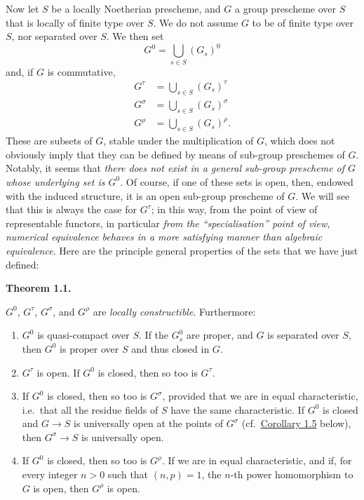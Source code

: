 \documentclass{article}
\providecommand{\tightlist}{%
  \setlength{\itemsep}{0pt}\setlength{\parskip}{0pt}}
\newenvironment{itenv}[1]
  {\phantomsection\par\smallskip\noindent\textbf{#1.}\itshape}
  {\par\smallskip}
\newcommand{\oldpage}[1]{\marginpar{\footnotesize$\Big\vert$ \textit{p.~#1}}}
\theoremstyle{definition}
\theoremstyle{definition}
\theoremstyle{definition}
\theoremstyle{definition}
\theoremstyle{remark}
\begin{document}
Now let \(S\) be a locally Noetherian prescheme, and \(G\) a group prescheme over \(S\) that is locally of finite type over \(S\).
We do not assume \(G\) to be of finite type over \(S\), nor separated over \(S\).
We then set
\[
  G^0
  = \bigcup_{s\in S} (G_s)^0
\]
and, if \(G\) is commutative,
\[
  \begin{aligned}
    G^\tau
    &= \bigcup_{s\in S} (G_s)^\tau
  \\G^\sigma
    &= \bigcup_{s\in S} (G_s)^\sigma
  \\G^\rho
    &= \bigcup_{s\in S} (G_s)^\rho.
  \end{aligned}
\]
\oldpage{236-04}These are subsets of \(G\), stable under the multiplication of \(G\), which does not obviously imply that they can be defined by means of sub-group preschemes of \(G\).
Notably, it seems that \emph{there does not exist in a general sub-group prescheme of \(G\) whose underlying set is \(G^0\)}.
Of course, if one of these sets is open, then, endowed with the induced structure, it is an open sub-group prescheme of \(G\).
We will see that this is always the case for \(G^\tau\);
in this way, from the point of view of representable functors, in particular \emph{from the ``specialisation'' point of view, numerical equivalence behaves in a more satisfying manner than algebraic equivalence}.
Here are the principle general properties of the sets that we have just defined:

\hypertarget{fga-3-vi-theorem-1.1}{}
\begin{itenv}{Theorem 1.1}

\(G^0\), \(G^\tau\), \(G^\sigma\), and \(G^\rho\) are \emph{locally constructible}.
Furthermore:

\begin{enumerate}
\def\labelenumi{\roman{enumi}.}
\tightlist
\item
  \(G^0\) is quasi-compact over \(S\).
  If the \(G_s^0\) are proper, and \(G\) is separated over \(S\), then \(G^0\) is proper over \(S\) and thus closed in \(G\).
\item
  \(G^\tau\) is open.
  If \(G^0\) is closed, then so too is \(G^\tau\).
\item
  If \(G^0\) is closed, then so too is \(G^\sigma\), provided that we are in equal characteristic, i.e.~that all the residue fields of \(S\) have the same characteristic.
  If \(G^0\) is closed and \(G\to S\) is universally open at the points of \(G^\sigma\) (cf.~\protect\hyperlink{fga-3-vi-corollary-1.5}{Corollary 1.5} below), then \(G^\sigma\to S\) is universally open.
\item
  If \(G^0\) is closed, then so too is \(G^\rho\).
  If we are in equal characteristic, and if, for every integer \(n>0\) such that \((n,p)=1\), the \(n\)-th power homomorphism to \(G\) is open, then \(G^\rho\) is open.
\end{enumerate}

\end{itenv}
\end{document}
